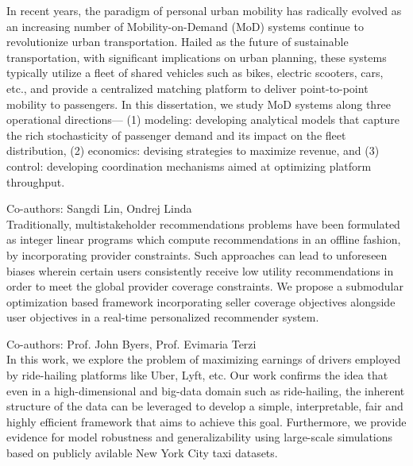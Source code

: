 \documentclass[10pt]{moderncv}
\begin{document}
{
    In recent years, the paradigm of personal urban mobility has radically evolved as an increasing number of 
        Mobility-on-Demand (MoD) systems continue to revolutionize urban transportation. 
    Hailed as the future of sustainable transportation, with significant implications on urban planning, these systems 
        typically utilize a fleet of shared vehicles such as bikes, electric scooters, cars, etc., and provide a 
        centralized matching platform to deliver point-to-point mobility to passengers. 
    In this dissertation, we study MoD systems along three operational directions—
    (1) modeling: developing analytical models that capture the rich stochasticity of passenger demand and its impact 
        on the fleet distribution,
    (2) economics: devising strategies to maximize revenue, and 
    (3) control: developing coordination mechanisms aimed at optimizing platform throughput.
}

{
    Co-authors: Sangdi Lin, Ondrej Linda\\
    Traditionally, multistakeholder recommendations problems have been formulated as integer linear programs which 
        compute recommendations in an offline fashion, by incorporating provider constraints.
    Such approaches can lead to unforeseen biases wherein certain users consistently receive low utility 
        recommendations in order to meet the global provider coverage constraints. 
    We propose a submodular optimization based framework incorporating seller coverage objectives alongside user 
        objectives in a real-time personalized recommender system.
}

{
    Co-authors: Prof. John Byers, Prof. Evimaria Terzi\\
    In this work, we explore the problem of maximizing earnings of drivers employed by ride-hailing platforms like 
        Uber, Lyft, etc. Our work confirms the idea that even in a high-dimensional and big-data domain such as 
        ride-hailing, the inherent structure of the data can be leveraged to develop a simple, interpretable, fair and 
        highly efficient framework that aims to achieve this goal. 
    Furthermore, we provide evidence for model robustness and generalizability using large-scale simulations based on 
        publicly avilable New York City taxi datasets.
}
\end{document}
